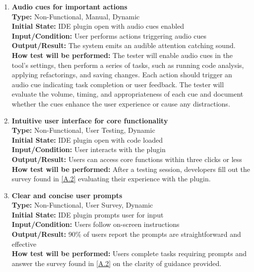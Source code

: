 \documentclass[12pt, titlepage]{article}
\begin{document}
\begin{enumerate}[label={\bf \textcolor{Maroon}{test-UH-\arabic*}}, wide=0pt, font=\itshape]
  \item \textbf{Audio cues for important actions} \\[2mm]
    \textbf{Type:} Non-Functional, Manual, Dynamic \\
    \textbf{Initial State:} IDE plugin open with audio cues enabled \\
    \textbf{Input/Condition:} User performs actions triggering audio cues \\
    \textbf{Output/Result:} The system emits an audible attention catching sound. \\[2mm]
    \textbf{How test will be performed:} The tester will enable audio cues in the tool's settings, then perform a series of tasks, such as running code analysis, applying refactorings, and saving changes. Each action should trigger an audio cue indicating task completion or user feedback. The tester will evaluate the volume, timing, and appropriateness of each cue and document whether the cues enhance the user experience or cause any distractions. 

  \item \textbf{Intuitive user interface for core functionality} \\[2mm]
    \textbf{Type:} Non-Functional, User Testing, Dynamic \\
    \textbf{Initial State:} IDE plugin open with code loaded \\
    \textbf{Input/Condition:} User interacts with the plugin \\
    \textbf{Output/Result:} Users can access core functions within three clicks or less \\[2mm]
    \textbf{How test will be performed:} After a testing session, developers fill out the survey found in \ref{A.2} evaluating their experience with the plugin.

  \item \textbf{Clear and concise user prompts} \\[2mm]
    \textbf{Type:} Non-Functional, User Survey, Dynamic \\
    \textbf{Initial State:} IDE plugin prompts user for input \\
    \textbf{Input/Condition:} Users follow on-screen instructions \\
    \textbf{Output/Result:} 90\% of users report the prompts are straightforward and effective \\[2mm]
    \textbf{How test will be performed:} Users complete tasks requiring prompts and answer the survey found in \ref{A.2} on the clarity of guidance provided.


\end{enumerate}
\end{document}
